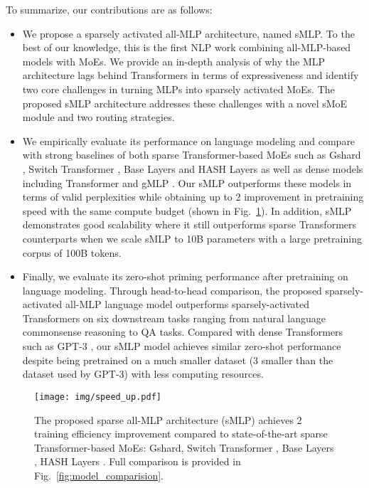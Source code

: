 \documentclass{article}
\begin{document}
To summarize, our contributions are as follows:
\begin{itemize}
\item We propose a sparsely activated all-MLP architecture, named sMLP. To the best of our knowledge, this is the first NLP work combining all-MLP-based models with MoEs. We provide an in-depth analysis of why the MLP architecture lags behind Transformers in terms of expressiveness and identify two core challenges in turning MLPs into sparsely activated MoEs. The proposed sMLP architecture addresses these challenges with a novel sMoE module and two routing strategies. 
\item We empirically evaluate its performance on language modeling and compare with strong baselines of both sparse Transformer-based MoEs such as Gshard \citep{gshard}, Switch Transformer \citep{switch}, Base Layers \citep{baselayer} and HASH Layers \citep{hashlayer} as well as dense models including Transformer \citep{vaswani2017attention} and gMLP \citep{gmlp}. Our sMLP outperforms these models in terms of valid perplexities while obtaining up to 2  improvement in pretraining speed with the same compute budget (shown in Fig.~\ref{fig:speed_up}). In addition, sMLP demonstrates good scalability where it still outperforms sparse Transformers counterparts when we scale sMLP to 10B parameters with a large pretraining corpus of 100B tokens.
\item Finally, we evaluate its zero-shot priming performance after pretraining on language modeling. Through head-to-head comparison, the proposed sparsely-activated all-MLP language model outperforms sparsely-activated Transformers on six downstream tasks ranging from natural language commonsense reasoning to QA tasks.
    Compared with dense Transformers such as GPT-3 \citep{gpt3}, our sMLP model achieves similar zero-shot performance despite being pretrained on a much smaller dataset (3  smaller than the dataset used by GPT-3) with less computing resources.
\end{itemize}








\begin{figure}
    \centering
    \texttt{[image: img/speed\_up.pdf]}
    \vspace{-6mm}
    \caption{The proposed sparse all-MLP architecture (sMLP) achieves 2 training efficiency improvement compared to state-of-the-art sparse Transformer-based MoEs: Gshard\citep{gshard}, Switch Transformer \citep{switch}, Base Layers \citep{baselayer}, HASH Layers \citep{hashlayer}. Full comparison is provided in Fig.~\ref{fig:model_comparision}.} 
\label{fig:speed_up}
\end{figure}
\end{document}
